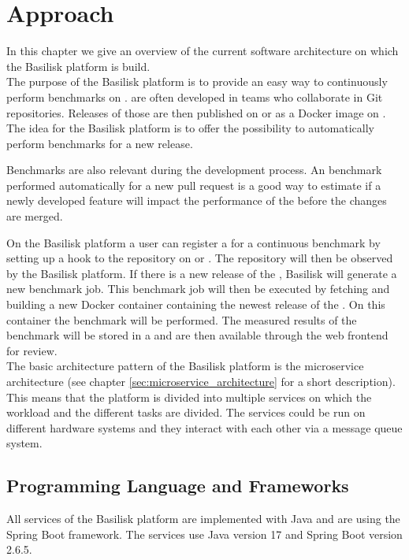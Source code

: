 \chapter{Approach}
\label{ch:approach}

In this chapter we give an overview of the current software architecture on which the Basilisk platform is build.
\\

The purpose of the Basilisk platform is to provide an easy way to continuously perform benchmarks on \tsp{}.
\tsp{} are often developed in teams who collaborate in Git repositories.
Releases of those \tsp{} are then published on \gh{} or as a Docker image on \dockh{}.
The idea for the Basilisk platform is to offer the possibility to automatically perform benchmarks for a new \ts{} release.

Benchmarks are also relevant during the development process.
An benchmark performed automatically for \eg{} a new pull request is a good way to estimate if a newly developed feature will impact the performance of the \ts{} before the changes are merged.

On the Basilisk platform a user can register a \ts{} for a continuous benchmark by setting up a hook to the repository on \gh{} or \dockh{}.
The repository will then be observed by the Basilisk platform.
If there is a new release of the \ts{}, Basilisk will generate a new benchmark job.
This benchmark job will then be executed by fetching and building a new Docker container containing the newest release of the \ts{}.
On this container the benchmark will be performed.
The measured results of the benchmark will be stored in a \ts{} and are then available through the web frontend for review.
\\

The basic architecture pattern of the Basilisk platform is the microservice architecture (see chapter \ref{sec:microservice_architecture} for a short description). 
This means that the platform is divided into multiple services on which the workload and the different tasks are divided.
The services could be run on different hardware systems and they interact with each other via a message queue system.
\\

\section{Programming Language and Frameworks}
\label{sec:prog_lang_and_framework}
All services of the Basilisk platform are implemented with Java and are using the Spring Boot framework.
The services use Java version 17 and Spring Boot version 2.6.5.

